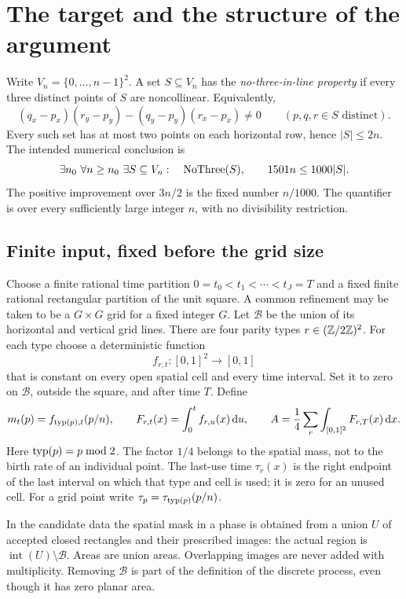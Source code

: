 \section{The target and the structure of the argument}\label{sec:overview}

Write \(V_n=\{0,\ldots,n-1\}^2\). A set \(S\subseteq V_n\) has the
\emph{no-three-in-line property} if every three distinct points of \(S\)
are noncollinear. Equivalently,
\[
 (q_x-p_x)(r_y-p_y)-(q_y-p_y)(r_x-p_x)\ne0
 \qquad(p,q,r\in S\text{ distinct}).
\]
Every such set has at most two points on each horizontal row, hence
\(|S|\le2n\). The intended numerical conclusion is
\begin{equation}\label{eq:target}
 \exists n_0\ \forall n\ge n_0\ \exists S\subseteq V_n:
 \quad \operatorname{NoThree}(S),\qquad 1501n\le1000|S|.
\end{equation}
The positive improvement over \(3n/2\) is the fixed number \(n/1000\).
The quantifier is over every sufficiently large integer \(n\), with no
divisibility restriction.

\subsection{Finite input, fixed before the grid size}
Choose a finite rational time partition
\(0=t_0<t_1<\cdots<t_J=T\) and a fixed finite rational rectangular
partition of the unit square. A common refinement may be taken to be a
\(G\times G\) grid for a fixed integer \(G\). Let \(\mathcal B\) be the
union of its horizontal and vertical grid lines.
There are four parity types \(r\in(\mathbb Z/2\mathbb Z)^2\). For each type choose
a deterministic function
\[
 f_{r,t}:[0,1]^2\longrightarrow[0,1]
\]
that is constant on every open spatial cell and every time interval.
Set it to zero on \(\mathcal B\), outside the square, and after time \(T\).
Define
\begin{equation}\label{eq:input}
 m_t(p)=f_{\operatorname{typ}(p),t}(p/n),\qquad
 F_{r,t}(x)=\int_0^t f_{r,u}(x)\,\mathrm d u,\qquad
 A=\frac14\sum_r\int_{[0,1]^2}F_{r,T}(x)\,\mathrm d x.
\end{equation}
Here \(\operatorname{typ}(p)=p\bmod2\). The factor \(1/4\) belongs to the spatial
mass, not to the birth rate of an individual point.
The last-use time \(\tau_r(x)\) is the right endpoint of the last interval
on which that type and cell is used; it is zero for an unused cell.
For a grid point write \(\tau_p=\tau_{\operatorname{typ}(p)}(p/n)\).

In the candidate data the spatial mask in a phase is obtained from a
union \(U\) of accepted closed rectangles and their prescribed images:
the actual region is \(\operatorname{int}(U)\setminus\mathcal B\).
Areas are union areas. Overlapping images are never added with
multiplicity. Removing \(\mathcal B\) is part of the definition of the
discrete process, even though it has zero planar area.

